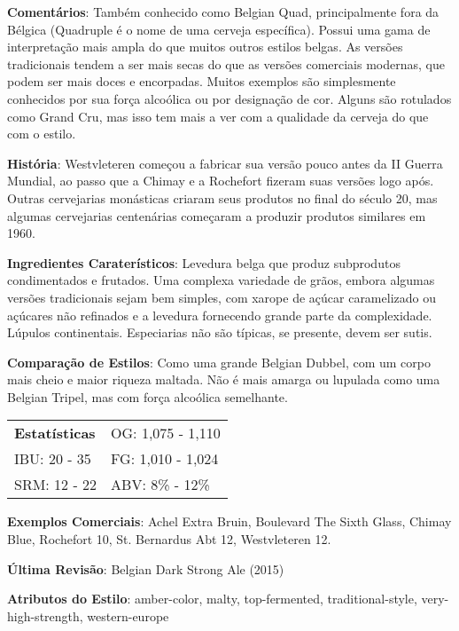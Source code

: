 \textbf{Comentários}: Também conhecido como Belgian Quad, principalmente fora da Bélgica (Quadruple é o nome de uma cerveja específica). Possui uma gama de interpretação mais ampla do que muitos outros estilos belgas. As versões tradicionais tendem a ser mais secas do que as versões comerciais modernas, que podem ser mais doces e encorpadas. Muitos exemplos são simplesmente conhecidos por sua força alcoólica ou por designação de cor. Alguns são rotulados como Grand Cru, mas isso tem mais a ver com a qualidade da cerveja do que com o estilo.

\textbf{História}: Westvleteren começou a fabricar sua versão pouco antes da II Guerra Mundial, ao passo que a Chimay e a Rochefort fizeram suas versões logo após. Outras cervejarias monásticas criaram seus produtos no final do século 20, mas algumas cervejarias centenárias começaram a produzir produtos similares em 1960.

\textbf{Ingredientes Caraterísticos}: Levedura belga que produz subprodutos condimentados e frutados. Uma complexa variedade de grãos, embora algumas versões tradicionais sejam bem simples, com xarope de açúcar caramelizado ou açúcares não refinados e a levedura fornecendo grande parte da complexidade. Lúpulos continentais. Especiarias não são típicas, se presente, devem ser sutis.

\textbf{Comparação de Estilos}: Como uma grande Belgian Dubbel, com um corpo mais cheio e maior riqueza maltada. Não é mais amarga ou lupulada como uma Belgian Tripel, mas com força alcoólica semelhante.

\begin{tabular}{@{}p{35mm}p{35mm}@{}}
  \textbf{Estatísticas} & OG: 1,075 - 1,110 \\
  IBU: 20 - 35  & FG: 1,010 - 1,024  \\
  SRM: 12 - 22  & ABV: 8\% - 12\%
\end{tabular}

\textbf{Exemplos Comerciais}: Achel Extra Bruin, Boulevard The Sixth Glass, Chimay Blue, Rochefort 10, St. Bernardus Abt 12, Westvleteren 12.

\textbf{Última Revisão}: Belgian Dark Strong Ale (2015)

\textbf{Atributos do Estilo}: amber-color, malty, top-fermented, traditional-style, very-high-strength, western-europe
